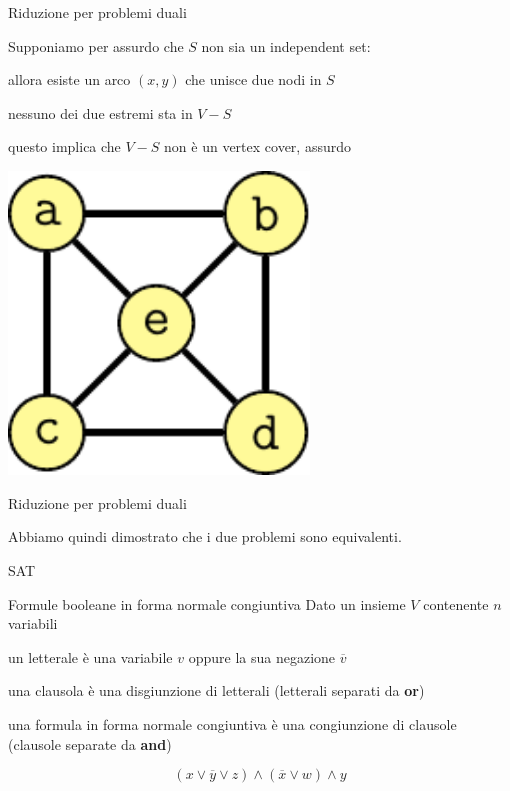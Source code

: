 \begin{frame}{Riduzione per problemi duali}

Supponiamo per assurdo che $S$ non sia un independent set:
\BI
\item allora esiste un arco $(x,y)$ che unisce due nodi in $S$
\item nessuno dei due estremi sta in $V-S$
\item questo implica che $V-S$ non è un vertex cover, assurdo
\EI

\begin{center}
\includegraphics[width=0.6\textwidth,page=3]{cover.pdf}
\end{center}

\end{frame}

\begin{frame}{Riduzione per problemi duali}

Abbiamo quindi dimostrato che i due problemi sono equivalenti.

\end{frame}

\begin{frame}{SAT}

\vspace{-9pt}
\begin{block}{Formule booleane in forma normale congiuntiva}
Dato un insieme $V$ contenente $n$ \alert{variabili}
\BIL
\item un \alert{letterale} è una variabile $v$ oppure la sua negazione $\overline{v}$
\item una \alert{clausola} è una disgiunzione di letterali (letterali separati da \textbf{or})
\item una \alert{formula in forma normale congiuntiva} è una congiunzione di clausole (clausole separate da \textbf{and})
\EIL
\end{block}

\bigskip
{}
\[
  (x \vee \overline{y} \vee z) \wedge (\overline{x} \vee w) \wedge y
\]

\end{frame}

